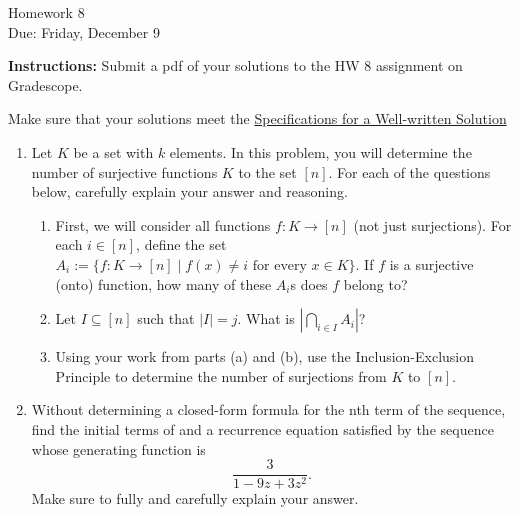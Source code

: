 \documentclass[12pt]{article}
\begin{document}
\begin{center}
{\Large Homework 8}\\
Due: Friday, December 9\\
\end{center}
{\bf Instructions:} Submit a pdf of your solutions to the HW 8 assignment on Gradescope. 

Make sure that your solutions meet the \href{https://docs.google.com/document/d/18LfQoqi6BsY2VdAlpC5xdYEA2rxSGoH0891nVec4_Os/edit?usp=sharing}{Specifications for a Well-written Solution} 

\begin{enumerate}
\item Let $K$ be a set with $k$ elements. In this problem, you will determine the number of surjective functions $K$ to the set $[n]$.  For each of the questions below, carefully explain your answer and reasoning. 
\begin{enumerate}
\item First, we will consider all functions $f:K\to [n]$ (not just surjections). For each $i\in [n]$, define the set $A_i:=\{f:K\to [n]\mid f(x)\ne i \text{ for every } x\in K\}$.  If $f$ is a surjective (onto) function, how many of these $A_i$s does $f$ belong to? 
\item Let $I\subseteq [n]$ such that $|I|=j$. What is $|\bigcap_{i\in I} A_i|$?
\item Using your work from parts (a) and (b), use the Inclusion-Exclusion Principle to determine the number of surjections from $K$ to $[n]$. 
\end{enumerate} 

\item Without determining a closed-form formula for the nth term of the sequence, find the initial terms of and a recurrence equation satisfied by the sequence whose generating function is 
$$\frac{3}{1-9z+3z^2}.$$ Make sure to fully and carefully explain your answer. 
\end{enumerate}
\end{document}
